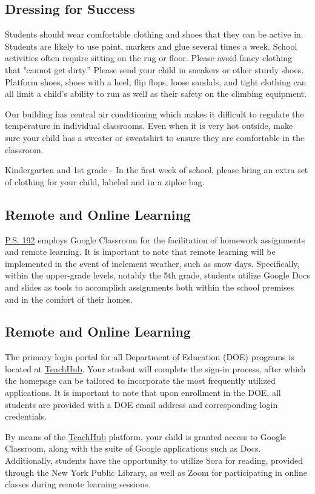 \documentclass[11pt, letterpaper]{article}
\begin{document}
\subsection{Dressing for Success}
Students should wear comfortable clothing and shoes that they can be active in. Students are likely to use paint, markers and glue several times a week. School activities often require sitting on the rug or floor. Please avoid fancy clothing that "cannot get dirty.” Please send your child in sneakers or other sturdy shoes. Platform shoes, shoes with a heel, flip flops, loose sandals, and tight clothing can all limit a child’s ability to run as well as their safety on the climbing equipment.

Our building has central air conditioning which makes it difficult to regulate the temperature in individual classrooms. Even when it is very hot outside, make sure your child has a sweater or sweatshirt to ensure they are comfortable in the classroom.  

Kindergarten and 1st grade - In the first week of school, please bring an extra set of clothing for your child, labeled and in a ziploc bag.

\subsection{Remote and Online Learning}
\href{https://www.ps192.org}{P.S. 192} employs Google Classroom for the facilitation of homework assignments and remote learning. It is important to note that remote learning will be implemented in the event of inclement weather, such as snow days. Specifically, within the upper-grade levels, notably the 5th grade, students utilize Google Docs and slides as tools to accomplish assignments both within the school premises and in the comfort of their homes.

\subsection{Remote and Online Learning}
The primary login portal for all Department of Education (DOE) programs is located at \href{https://www.ps192.org}{TeachHub}. Your student will complete the sign-in process, after which the homepage can be tailored to incorporate the most frequently utilized applications. It is important to note that upon enrollment in the DOE, all students are provided with a DOE email address and corresponding login credentials.

By means of the \href{https://www.ps192.org}{TeachHub} platform, your child is granted access to Google Classroom, along with the suite of Google applications such as Docs. Additionally, students have the opportunity to utilize Sora for reading, provided through the New York Public Library, as well as Zoom for participating in online classes during remote learning sessions.
\end{document}
